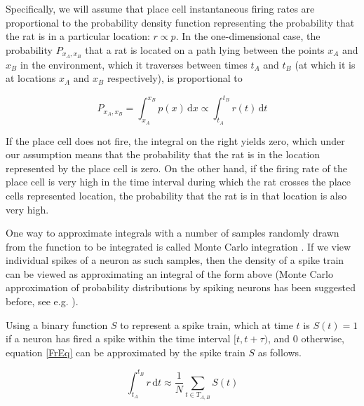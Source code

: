 
Specifically, we will assume that place cell instantaneous firing rates are proportional to the probability density function representing the probability that the rat is in a particular location: $ r \propto p $. In the one-dimensional case, the probability $ P_{x_A,x_B} $ that a rat is located on a path lying between the points $ x_A $ and $ x_B $ in the environment, which it traverses between times $ t_A $ and $ t_B $ (at which it is at locations $x_A$ and $x_B$ respectively), is proportional to 

\begin{equation}\label{FrEq}
P_{x_A,x_B} = \int_{x_A}^{x_B}{p(x) \, \mathrm{d}x} \propto \int_{t_A}^{t_B}{r(t) \, \mathrm{d}t}
\end{equation} 

If the place cell does not fire, the integral on the right yields zero, which under our assumption means that the probability that the rat is in the location represented by the place cell is zero. On the other hand, if the firing rate of the place cell is very high in the time interval during which the rat crosses the place cells represented location, the probability that the rat is in that location is also very high.

One way to approximate integrals with a number of samples randomly drawn from the function to be integrated is called Monte Carlo integration \cite{Robert1999}. If we view individual spikes of a neuron as such samples, then the density of a spike train can be viewed as approximating an integral of the form above (Monte Carlo approximation of probability distributions by spiking neurons has been suggested before, see e.g. \cite{Hoyer2003, Paulin2005, Paulin2011, Busing2011}). 


Using a binary function $ S $ to represent a spike train, which at time $ t $ is $ S(t)=1 $ if a neuron has fired a spike within the time interval $ [t, t+\tau) $, and $0$ otherwise, equation \eqref{FrEq} can be approximated by the spike train $ S $ as follows. 

\begin{equation}\label{McEq}
\int_{t_A}^{t_B}{r \, \mathrm{d}t} \approx \frac{1}{N} \sum_{t \in T_{A,B}}{S(t)}
\end{equation} 

